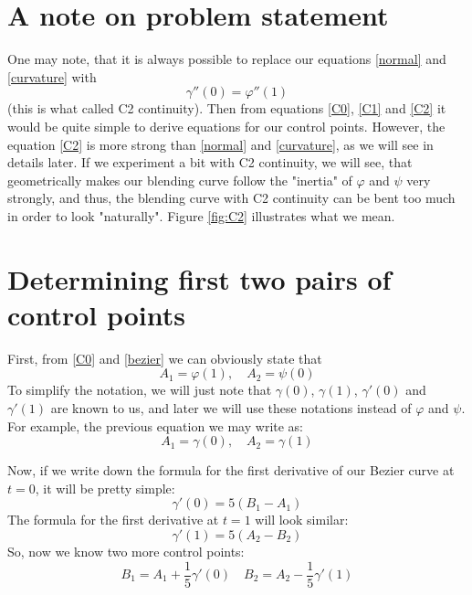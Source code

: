\documentclass[12pt,a4paper]{article}
\begin{document}
\section{A note on problem statement}
One may note, that it is always possible to replace our equations \eqref{normal} and \eqref{curvature} with
\begin{equation}\label{C2}
\gamma''(0) = \varphi''(1)
\end{equation}
(this is what called C2 continuity).
Then from equations \eqref{C0}, \eqref{C1} and \eqref{C2} it would be quite simple to derive equations for our control points. However, the equation \eqref{C2} is more strong than \eqref{normal} and \eqref{curvature}, as we will see in details later. If we experiment a bit with C2 continuity, we will see, that geometrically makes our blending curve follow the "inertia" of $\varphi$ and $\psi$ very strongly, and thus, the blending curve with C2 continuity can be bent too much in order to look "naturally". Figure \ref{fig:C2} illustrates what we mean.

\section{Determining first two pairs of control points}

First, from \eqref{C0} and \eqref{bezier} we can obviously state that
$$
A_1 = \varphi(1),\quad A_2 = \psi(0)
$$
To simplify the notation, we will just note that $\gamma(0)$, $\gamma(1)$, $\gamma'(0)$ and $\gamma'(1)$ are known to us, and later we will use these notations instead of $\varphi$ and $\psi$. For example, the previous equation we may write as:
\begin{equation}
A_1 = \gamma(0), \quad A_2 = \gamma(1)
\end{equation}

Now, if we write down the formula for the first derivative of our Bezier curve at $t = 0$, it will be pretty simple:
\begin{equation}
\gamma'(0) = 5(B_1 - A_1)
\end{equation}
The formula for the first derivative at $t = 1$ will look similar:
\begin{equation}
\gamma'(1) = 5(A_2 - B_2)
\end{equation}
So, now we know two more control points:
\begin{equation}
B_1 = A_1 + \frac{1}{5}\gamma'(0) \quad B_2 = A_2 - \frac{1}{5}\gamma'(1)
\end{equation}
\end{document}
